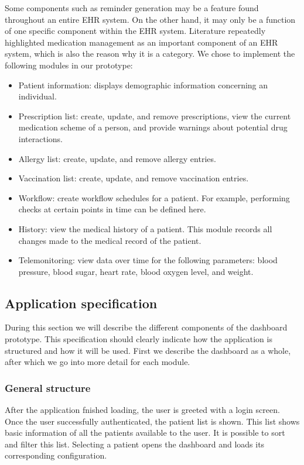         \noindent Some components such as reminder generation may be a feature found throughout an entire EHR system. On the other hand, it may only be a function of one specific component within the EHR system. Literature repeatedly highlighted medication management as an important component of an EHR system, which is also the reason why it is a category. We chose to implement the following modules in our prototype:
        \begin{itemize}
            \item Patient information: displays demographic information concerning an individual.
            \item Prescription list: create, update, and remove prescriptions, view the current medication scheme of a person, and provide warnings about potential drug interactions.
            \item Allergy list: create, update, and remove allergy entries.
            \item Vaccination list: create, update, and remove vaccination entries.
            \item Workflow: create workflow schedules for a patient. For example, performing checks at certain points in time can be defined here.
            \item History: view the medical history of a patient. This module records all changes made to the medical record of the patient.
            \item Telemonitoring: view data over time for the following parameters: blood pressure, blood sugar, heart rate, blood oxygen level, and weight.
        \end{itemize}

    \subsection{Application specification}\label{app_specification}

    During this section we will describe the different components of the dashboard prototype. This specification should clearly indicate how the application is structured and how it will be used. First we describe the dashboard as a whole, after which we go into more detail for each module.

        \subsubsection{General structure}

        After the application fnished loading, the user is greeted with a login screen. Once the user successfully authenticated, the patient list is shown. This list shows basic information of all the patients available to the user. It is possible to sort and filter this list. Selecting a patient opens the dashboard and loads its corresponding configuration.

